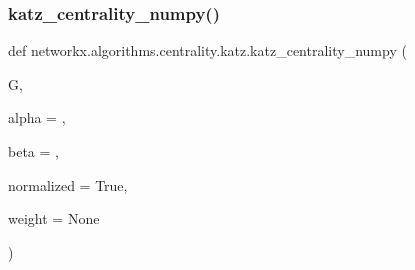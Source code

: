 \subsubsection{\texorpdfstring{katz\+\_\+centrality\+\_\+numpy()}{katz\_centrality\_numpy()}}
{\footnotesize\ttfamily def networkx.\+algorithms.\+centrality.\+katz.\+katz\+\_\+centrality\+\_\+numpy (\begin{DoxyParamCaption}\item[{}]{G,  }\item[{}]{alpha = {},  }\item[{}]{beta = {},  }\item[{}]{normalized = {\ttfamily True},  }\item[{}]{weight = {\ttfamily None} }\end{DoxyParamCaption})}

